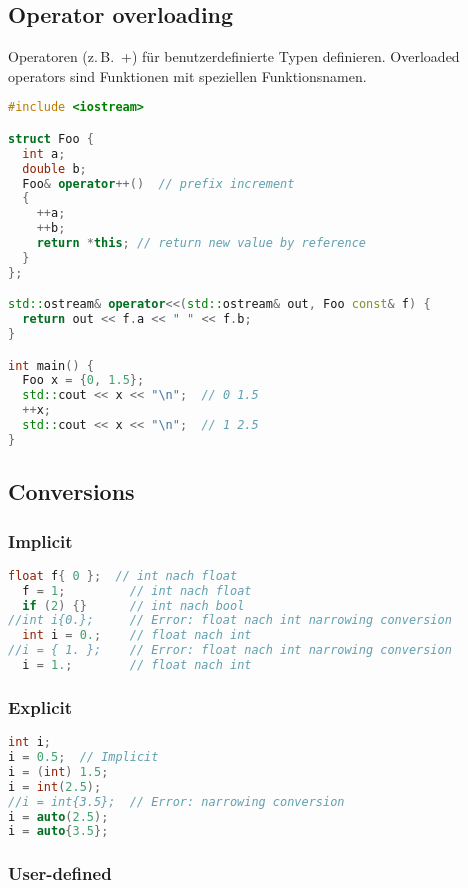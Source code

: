 \subsection{Operator overloading}

Operatoren (z.\,B.\ +) für benutzerdefinierte Typen definieren. Overloaded operators sind Funktionen mit speziellen Funktionsnamen.

\begin{lstlisting}[language=C++]
#include <iostream>

struct Foo {
  int a;
  double b;
  Foo& operator++()  // prefix increment
  {
    ++a;
    ++b;
    return *this; // return new value by reference
  }
};

std::ostream& operator<<(std::ostream& out, Foo const& f) {
  return out << f.a << " " << f.b;
}

int main() {
  Foo x = {0, 1.5};
  std::cout << x << "\n";  // 0 1.5
  ++x;
  std::cout << x << "\n";  // 1 2.5
}
\end{lstlisting}

\subsection{Conversions}

\subsubsection{Implicit}

\begin{lstlisting}[language=C++]
  float f{ 0 };  // int nach float
  f = 1;         // int nach float
  if (2) {}      // int nach bool
//int i{0.};     // Error: float nach int narrowing conversion
  int i = 0.;    // float nach int
//i = { 1. };    // Error: float nach int narrowing conversion
  i = 1.;        // float nach int
\end{lstlisting}

\subsubsection{Explicit}

\begin{lstlisting}[language=C++]
int i;
i = 0.5;  // Implicit
i = (int) 1.5;
i = int(2.5);
//i = int{3.5};  // Error: narrowing conversion
i = auto(2.5);
i = auto{3.5};
\end{lstlisting}

\subsubsection{User-defined}

